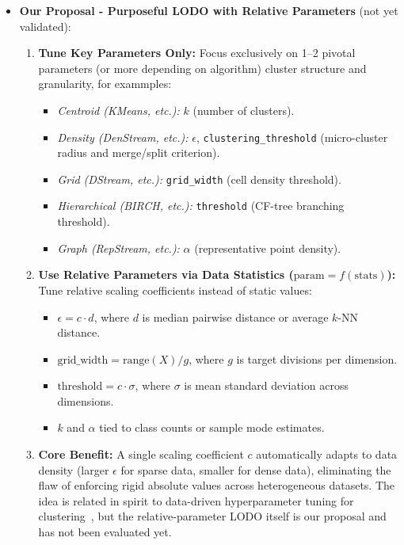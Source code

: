 \begin{enumerate}[label=\textbf{C\arabic*.},leftmargin=2.2em]
\begin{itemize}[leftmargin=1.2em,itemsep=2pt,topsep=1pt]
    \item \textbf{Our Proposal - Purposeful LODO with Relative Parameters} (not yet validated):
    \begin{enumerate}[label=(\alph*),leftmargin=1.4em,itemsep=2pt]
      \item \textbf{Tune Key Parameters Only:} Focus exclusively on 1--2 pivotal parameters (or more depending on algorithm)  cluster structure and granularity, for exammples:
      \begin{itemize}[leftmargin=1.2em,itemsep=1pt]
        \item \emph{Centroid (KMeans, etc.):} $k$ (number of clusters).
        \item \emph{Density (DenStream, etc.):} $\epsilon$, \texttt{clustering\_threshold} (micro-cluster radius and merge/split criterion).
        \item \emph{Grid (DStream, etc.):} \texttt{grid\_width} (cell density threshold).
        \item \emph{Hierarchical (BIRCH, etc.):} \texttt{threshold} (CF-tree branching threshold).
        \item \emph{Graph (RepStream, etc.):} $\alpha$ (representative point density).
      \end{itemize}
      \item \textbf{Use Relative Parameters via Data Statistics ($\text{param} = f(\text{stats})$):} Tune relative scaling coefficients instead of static values:
      \begin{itemize}[leftmargin=1.2em,itemsep=1pt]
        \item $\epsilon = c \cdot d$, where $d$ is median pairwise distance or average $k$-NN distance.
        \item $\text{grid\_width} = \text{range}(X) / g$, where $g$ is target divisions per dimension.
        \item $\text{threshold} = c \cdot \sigma$, where $\sigma$ is mean standard deviation across dimensions.
        \item $k$ and $\alpha$ tied to class counts or sample mode estimates.
      \end{itemize}
      \item \textbf{Core Benefit:} A single scaling coefficient $c$ automatically adapts to data density (larger $\epsilon$ for sparse data, smaller for dense data), eliminating the flaw of enforcing rigid absolute values across heterogeneous datasets. The idea is related in spirit to data-driven hyperparameter tuning for clustering~\cite{fan2020hyperparameter}, but the relative-parameter LODO itself is our proposal and has not been evaluated yet.
    \end{enumerate}
  \end{itemize}
\end{enumerate}


